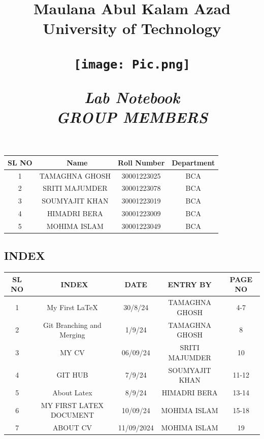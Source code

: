 \documentclass[12pt]{article}
\title{
    \vspace{0.2in}
    \Huge \textbf{Maulana Abul Kalam Azad University of Technology} \\
    \vspace{0.5in} %
    \begin{center}
        \texttt{[image: Pic.png]} %
    \end{center}
    \vspace{0.5in}
    \Huge\textbf{\textit{Lab Notebook}} \\
    \vspace{0.5in}
    \newpage
    \Large \textbf{\textit{GROUP MEMBERS}} \\
    \vspace{0.5in}
}
\date{}
\begin{document}
\maketitle

\begin{center}
    \begin{tabular}{|c| c | c | c |}
    \hline
    \textbf{SL NO}&\
    \textbf{Name} & \textbf{Roll Number} & \textbf{Department} \\
    \hline
     1 & TAMAGHNA GHOSH &30001223025 & BCA  \\
    \hline
     2& SRITI MAJUMDER & 30001223078 & BCA \\
    \hline
     3& SOUMYAJIT KHAN & 30001223019 & BCA   \\
    \hline
     4 & HIMADRI BERA & 30001223009 & BCA \\
    \hline
     5 & MOHIMA ISLAM & 30001223049 & BCA \\
    \hline
    \end{tabular}
\end{center}
\newpage

    
\begin{flushleft}
 \subsection*{INDEX}
  \begin{tabular}{|c|  c | c|c|c| }
    \hline
    \textbf{SL NO}&\
    \textbf{INDEX} & \textbf{DATE}&\textbf{ENTRY BY} &\textbf{PAGE NO} \\
    \hline
     1 & My First \LaTeX & 30/8/24&TAMAGHNA GHOSH & 4-7\\
    \hline
     2&Git Branching and Merging&1/9/24& TAMAGHNA GHOSH &8 \\
    \hline
     3&  MY CV & 06/09/24 & SRITI MAJUMDER & 10\\
    \hline
    4& GIT HUB &7/9/24 & SOUMYAJIT KHAN &11-12\\
     \hline
    5&About Latex & 8/9/24&HIMADRI BERA&13-14\\
    \hline
    6&MY FIRST LATEX DOCUMENT&10/09/24&MOHIMA ISLAM&15-18\\
    \hline
    7& ABOUT CV& 11/09/2024&MOHIMA ISLAM&19\\
     \end{tabular}
\end{flushleft}

\newpage

\end{document}
